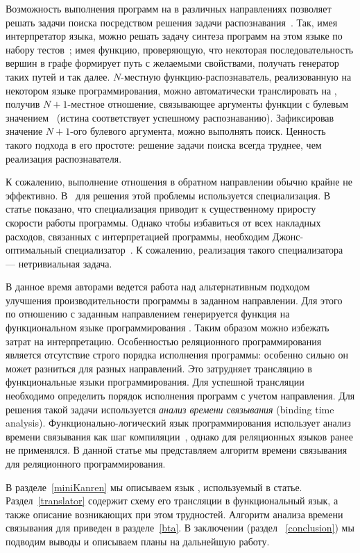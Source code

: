 \documentclass[conference,american,russian]{IEEEtran}
\begin{document}
Возможность выполнения программ на \miniKanren{} в различных направлениях позволяет решать задачи поиска посредством решения задачи распознавания~\cite{lozov2019relational}.
Так, имея интерпретатор языка, можно решать задачу синтеза программ на этом языке по набору тестов~\cite{byrd2017unified}; имея функцию, проверяющую, что некоторая последовательность вершин в графе формирует путь с желаемыми свойствами, получать генератор таких путей и так далее. 
$N$-местную функцию-распознаватель, реализованную на некотором языке программирования, можно автоматически транслировать на \miniKanren{}, получив $N+1$-местное отношение, связывающее аргументы функции с булевым значением~\cite{lozov2019relational} (истина соответствует успешному распознаванию). 
Зафиксировав значение $N+1$-ого булевого аргумента, можно выполнять поиск. 
Ценность такого подхода в его простоте: решение задачи поиска всегда труднее, чем реализация распознавателя. 

К сожалению, выполнение отношения в обратном направлении обычно крайне не эффективно. 
В~\cite{lozov2019relational} для решения этой проблемы используется специализация. 
В статье показано, что специализация приводит к существенному приросту скорости работы программы.
Однако чтобы избавиться от всех накладных расходов, связанных с интерпретацией программы, необходим Джонс-оптимальный специализатор~\cite{jones1993partial}. 
К сожалению, реализация такого специализатора --- нетривиальная задача.

В данное время авторами ведется работа над альтернативным подходом улучшения производительности программы в заданном направлении. 
Для этого по отношению с заданным направлением генерируется функция на функциональном языке программирования \haskell{}. 
Таким образом можно избежать затрат на интерпретацию. 
Особенностью реляционного программирования является отсутствие строго порядка исполнения программы: особенно сильно он может разниться для разных направлений.
Это затрудняет трансляцию в функциональные языки программирования. 
Для успешной трансляции необходимо определить порядок исполнения программ с учетом направления. 
Для решения такой задачи используется \textit{анализ времени связывания} (binding time analysis). 
Функционально-логический язык программирования \mercury{} использует анализ времени связывания как шаг компиляции~\cite{vanhoof2004binding}, однако для реляционных языков ранее не применялся.
В данной статье мы представляем алгоритм времени связывания для реляционного программирования. 

В разделе~\ref{miniKanren} мы описываем язык \miniKanren{}, используемый в статье.
Раздел~\ref{translator} содержит схему его трансляции в функциональный язык, а также описание возникающих при этом трудностей.
Алгоритм анализа времени связывания для \miniKanren{} приведен в разделе~\ref{bta}. 
В заключении (раздел ~\ref{conclusion}) мы подводим выводы и описываем планы на дальнейшую работу. 
\end{document}
